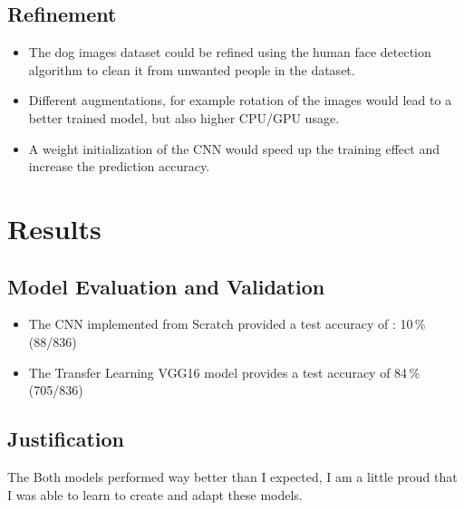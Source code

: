\documentclass[paper=A4, DIV=10, parskip=half]{scrartcl}
\begin{document}
\subsection*{Refinement}

\begin{itemize}
\item The dog images dataset could be refined using the human face detection algorithm
to clean it from unwanted people in the dataset.
\item Different augmentations, for example rotation of the images would lead to
a better trained model, but also higher CPU/GPU usage.
\item A weight initialization of the CNN would speed up the training effect and
increase the prediction accuracy.
\end{itemize}


\section*{Results}

\subsection*{Model Evaluation and Validation}

\begin{itemize}
  \item The CNN implemented from Scratch provided a test accuracy of : 10\,\%
  (88/836)
  \item The Transfer Learning VGG16 model provides a test accuracy of 84\,\% (705/836)
\end{itemize}


\subsection*{Justification}

The Both models performed way better than I expected, I am a little proud that I
was able to learn to create and adapt these models.


\end{document}
